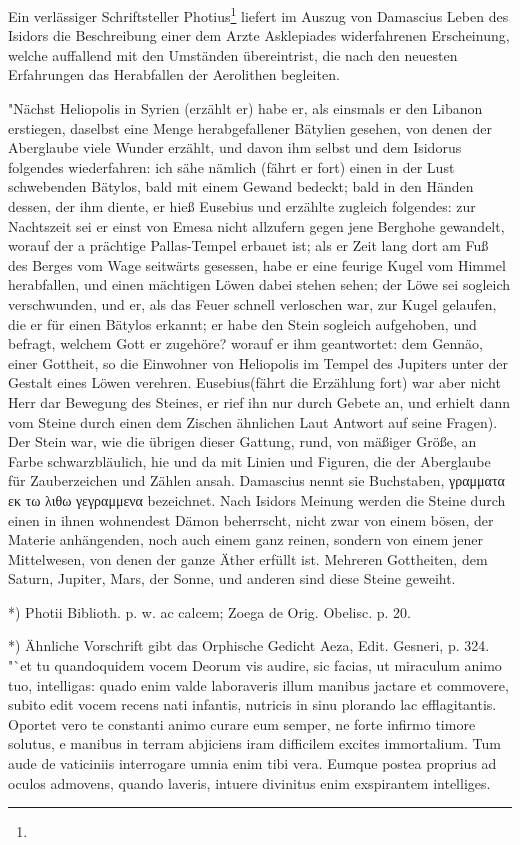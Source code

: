 \documentclass[a4paper, 11pt, oneside, polutonikogreek, german]{article}
\begin{document}
Ein verlässiger Schriftsteller Photius\footnote{} liefert im Auszug von Damascius Leben des Isidors die Beschreibung einer dem Arzte Asklepiades widerfahrenen Erscheinung, welche auffallend mit den Umständen übereintrist, die nach den neuesten Erfahrungen das Herabfallen der Aerolithen begleiten.

"Nächst Heliopolis in Syrien (erzählt er) habe er, als einsmals er den Libanon erstiegen, daselbst eine Menge herabgefallener Bätylien gesehen, von denen der Aberglaube viele Wunder erzählt, und davon ihm selbst und dem Isidorus folgendes wiederfahren: ich sähe nämlich (fährt er fort) einen in der Lust schwebenden Bätylos, bald mit einem Gewand bedeckt; bald in den Händen dessen, der ihm diente, er hieß Eusebius und erzählte zugleich folgendes: zur Nachtszeit sei er einst von Emesa nicht allzufern gegen jene Berghohe gewandelt, worauf der a prächtige Pallas-Tempel erbauet ist; als er Zeit lang dort am Fuß des Berges vom Wage seitwärts gesessen, habe er eine feurige Kugel vom Himmel herabfallen, und einen mächtigen Löwen dabei stehen sehen; der Löwe sei sogleich verschwunden, und er, als das Feuer schnell verloschen war, zur Kugel gelaufen, die er für einen Bätylos erkannt; er habe den Stein sogleich aufgehoben, und befragt, welchem Gott er zugehöre? worauf er ihm geantwortet: dem Gennäo, einer Gottheit, so die Einwohner von Heliopolis im Tempel des Jupiters unter der Gestalt eines Löwen verehren. Eusebius(fährt die Erzählung fort) war aber nicht Herr dar Bewegung des Steines, er rief ihn nur durch Gebete an, und erhielt dann vom Steine durch einen dem Zischen ähnlichen Laut Antwort auf seine Fragen). Der Stein war, wie die übrigen dieser Gattung, rund, von mäßiger Größe, an Farbe schwarzbläulich, hie und da mit Linien und Figuren, die der Aberglaube für Zauberzeichen und Zählen ansah. Damascius nennt sie Buchstaben, γραμματα εκ τω λιθω γεγραμμενα bezeichnet. Nach Isidors Meinung werden die Steine durch einen in ihnen wohnendest Dämon beherrscht, nicht zwar von einem bösen, der Materie anhängenden, noch auch einem ganz reinen, sondern von einem jener Mittelwesen, von denen der ganze Äther erfüllt ist. Mehreren Gottheiten, dem Saturn, Jupiter, Mars, der Sonne, und anderen sind diese Steine geweiht.

*) Photii Biblioth. p. w. ac calcem; Zoega de Orig. Obelisc. p. 20.

*) Ähnliche Vorschrift gibt das Orphische Gedicht Aeza, Edit. Gesneri, p. 324. "`et tu quandoquidem vocem Deorum vis audire, sic facias, ut miraculum animo tuo, intelligas: quado enim valde laboraveris illum manibus jactare et commovere, subito edit vocem recens nati infantis, nutricis in sinu plorando lac efflagitantis. Oportet vero te constanti animo curare eum semper, ne forte infirmo timore solutus, e manibus in terram abjiciens iram difficilem excites immortalium. Tum aude de vaticiniis interrogare umnia enim tibi vera. Eumque postea proprius ad oculos admovens, quando laveris, intuere divinitus enim exspirantem intelliges.
\end{document}
